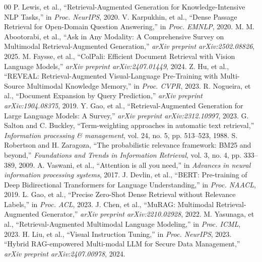 \documentclass[conference]{IEEEtran}
\begin{document}
\begin{thebibliography}{00}
\footnotesize
\setlength{\itemsep}{0pt}
 P. Lewis, et al., ``Retrieval-Augmented Generation for Knowledge-Intensive NLP Tasks,'' in \textit{Proc. NeurIPS}, 2020.
 V. Karpukhin, et al., ``Dense Passage Retrieval for Open-Domain Question Answering,'' in \textit{Proc. EMNLP}, 2020.
 M. M. Abootorabi, et al., ``Ask in Any Modality: A Comprehensive Survey on Multimodal Retrieval-Augmented Generation,'' \textit{arXiv preprint arXiv:2502.08826}, 2025.
 M. Faysse, et al., ``ColPali: Efficient Document Retrieval with Vision Language Models,'' \textit{arXiv preprint arXiv:2407.01449}, 2024.
 Z. Hu, et al., ``REVEAL: Retrieval-Augmented Visual-Language Pre-Training with Multi-Source Multimodal Knowledge Memory,'' in \textit{Proc. CVPR}, 2023.
 R. Nogueira, et al., ``Document Expansion by Query Prediction,'' \textit{arXiv preprint arXiv:1904.08375}, 2019.
 Y. Gao, et al., ``Retrieval-Augmented Generation for Large Language Models: A Survey,'' \textit{arXiv preprint arXiv:2312.10997}, 2023.
 G. Salton and C. Buckley, ``Term-weighting approaches in automatic text retrieval,'' \textit{Information processing \& management}, vol. 24, no. 5, pp. 513--523, 1988.
 S. Robertson and H. Zaragoza, ``The probabilistic relevance framework: BM25 and beyond,'' \textit{Foundations and Trends in Information Retrieval}, vol. 3, no. 4, pp. 333--389, 2009.
 A. Vaswani, et al., ``Attention is all you need,'' in \textit{Advances in neural information processing systems}, 2017.
 J. Devlin, et al., ``BERT: Pre-training of Deep Bidirectional Transformers for Language Understanding,'' in \textit{Proc. NAACL}, 2019.
 L. Gao, et al., ``Precise Zero-Shot Dense Retrieval without Relevance Labels,'' in \textit{Proc. ACL}, 2023.
 J. Chen, et al., ``MuRAG: Multimodal Retrieval-Augmented Generator,'' \textit{arXiv preprint arXiv:2210.02928}, 2022.
 M. Yasunaga, et al., ``Retrieval-Augmented Multimodal Language Modeling,'' in \textit{Proc. ICML}, 2023.
 H. Liu, et al., ``Visual Instruction Tuning,'' in \textit{Proc. NeurIPS}, 2023.
``Hybrid RAG-empowered Multi-modal LLM for Secure Data Management,'' \textit{arXiv preprint arXiv:2407.00978}, 2024.

\end{thebibliography}
\end{document}
